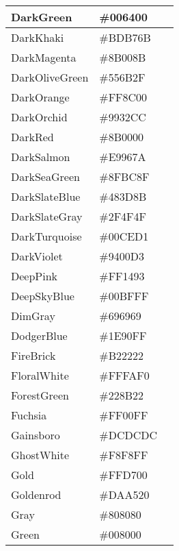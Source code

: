 \begin{longtable}{|p{100pt}|p{100pt}|p{100pt}|}
\hline
DarkGreen	&\#006400&\cellcolor{DarkGreen}	 \\
\hline
DarkKhaki	&\#BDB76B&\cellcolor{DarkKhaki}	 \\
\hline
DarkMagenta	&\#8B008B&\cellcolor{DarkMagenta}	 \\
\hline
DarkOliveGreen&\#556B2F	 &\cellcolor{DarkOliveGreen}\\
\hline
DarkOrange	&\#FF8C00	 &\cellcolor{DarkOrange}\\
\hline
DarkOrchid	&\#9932CC&\cellcolor{DarkOrchid}	 \\
\hline
DarkRed		&\#8B0000	 &\cellcolor{DarkRed}\\
\hline
DarkSalmon	&\#E9967A	 &\cellcolor{DarkSalmon}\\
\hline
DarkSeaGreen&\#8FBC8F	 &\cellcolor{DarkSeaGreen}\\
\hline
DarkSlateBlue&\#483D8B&\cellcolor{DarkSlateBlue}	 \\
\hline
DarkSlateGray&\#2F4F4F	 &\cellcolor{DarkSlateGray}\\
\hline
DarkTurquoise	&\#00CED1	 &\cellcolor{DarkTurquoise}\\
\hline
DarkViolet	&\#9400D3	 &\cellcolor{DarkViolet}\\
\hline
DeepPink		&\#FF1493	 &\cellcolor{DeepPink}\\
\hline
DeepSkyBlue	&\#00BFFF	 &\cellcolor{DeepSkyBlue}\\
\hline
DimGray		&\#696969	 &\cellcolor{DimGray}\\
\hline
DodgerBlue	&\#1E90FF	 &\cellcolor{DodgerBlue}\\
\hline
FireBrick		&\#B22222	 &\cellcolor{FireBrick}\\
\hline
FloralWhite	&\#FFFAF0	 &\cellcolor{FloralWhite}\\
\hline
ForestGreen	&\#228B22&\cellcolor{ForestGreen}	 \\
\hline
Fuchsia		&\#FF00FF	 &\cellcolor{Fuchsia}\\
\hline
Gainsboro	&\#DCDCDC	 &\cellcolor{Gainsboro}\\
\hline
GhostWhite	&\#F8F8FF	 &\cellcolor{GhostWhite}\\
\hline
Gold		&\#FFD700	 &\cellcolor{Gold}\\
\hline
Goldenrod	&\#DAA520	 &\cellcolor{Goldenrod}\\
\hline
Gray			&\#808080	 &\cellcolor{Gray}	\\
\hline
Green		&\#008000&\cellcolor{Green}	 \\

\end{longtable}
